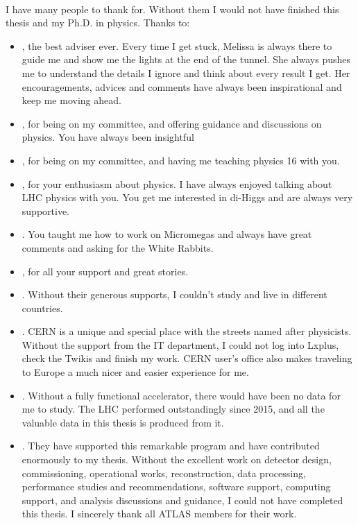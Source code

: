 
\paragraph{}
I have many people to thank for. Without them I would not have finished this thesis and my Ph.D. in physics. Thanks to:
\begin{itemize}
	\item {}, the best adviser ever. Every time I get stuck, Melissa is always there to guide me and show me the lights at the end of the tunnel. She always pushes me to understand the details I ignore and think about every result I get. Her encouragements, advices and comments have always been inspirational and keep me moving ahead.
	\item {}, for being on my committee, and offering guidance and discussions on physics. You have always been insightful
	\item {}, for being on my committee, and having me teaching physics 16 with you.
	\item {}, for your enthusiasm about physics. I have always enjoyed talking about LHC physics with you. You get me interested in di-Higgs and are always very supportive.
	\item {}. You taught me how to work on Micromegas and always have great comments and asking for the White Rabbits.
	\item {}, for all your support and great stories.
	\item {}. Without their generous supports, I couldn't study and live in different countries.
	\item {}. CERN is a unique and special place with the streets named after physicists. Without the support from the IT department, I could not log into Lxplus, check the Twikis and finish my work. CERN user's office also makes traveling to Europe a much nicer and easier experience for me.
	\item {}. Without a fully functional accelerator, there would have been no data for me to study. The LHC performed outstandingly since 2015, and all the valuable data in this thesis is produced from it. 
	\item {}. They have supported this remarkable program and have contributed enormously to my thesis. Without the excellent work on detector design, commissioning, operational works, reconstruction, data processing, performance studies and recommendations, software support, computing support, and analysis discussions and guidance, I could not have completed this thesis. I sincerely thank all ATLAS members for their work.

\end{itemize}
